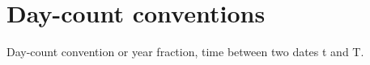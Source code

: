 \documentclass[11pt,a4paper]{article}
\numberwithin{equation}{section}
\begin{document}

	\section{Day-count conventions}
	Day-count convention or year fraction, time between two dates t and T.

\end{document}
